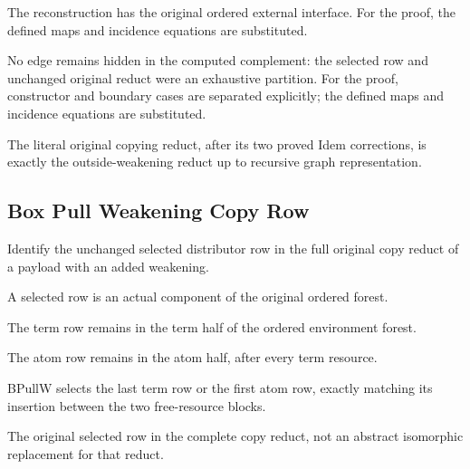 The reconstruction has the original ordered external interface.
For the proof, the defined maps and incidence equations are substituted.
\par{}

No edge remains hidden in the computed complement: the selected row and unchanged original reduct were an exhaustive partition.
For the proof, constructor and boundary cases are separated explicitly; the defined maps and incidence equations are substituted.
\par{}

The literal original copying reduct, after its two proved Idem corrections, is exactly the outside-weakening reduct up to recursive graph representation.
\par{}

\subsection{Box Pull Weakening Copy Row}
Identify the unchanged selected distributor row in the full original copy reduct of a payload with an added weakening.

A selected row is an actual component of the original ordered forest.
\par{}

The term row remains in the term half of the ordered environment forest.
\par{}

The atom row remains in the atom half, after every term resource.
\par{}

BPullW selects the last term row or the first atom row, exactly matching its insertion between the two free-resource blocks.
\par{}

The original selected row in the complete copy reduct, not an abstract isomorphic replacement for that reduct.
\par{}

